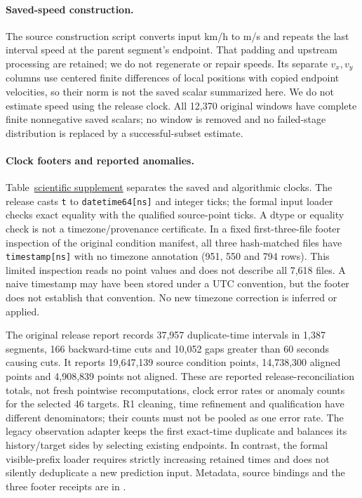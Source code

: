 \paragraph{Saved-speed construction.}
The source construction script converts input km/h to m/s and repeats
the last interval speed at the parent segment's endpoint. That padding and
upstream processing are retained; we do not regenerate or repair speeds.
Its separate \(v_x,v_y\) columns use centered finite differences of local
positions with copied endpoint velocities, so their norm is not the
saved scalar summarized here. We do not estimate speed using the release clock.
All 12,370 original windows have complete finite nonnegative saved
scalars; no window is removed and no failed-stage distribution is replaced
by a successful-subset estimate.

\paragraph{Clock footers and reported anomalies.}
Table~\href{supplement.pdf\#tab:clock-use}{scientific supplement} separates the saved and algorithmic clocks. The
release casts \texttt{t} to \texttt{datetime64[ns]} and integer ticks; the
formal input loader checks exact equality with the qualified source-point
ticks. A dtype or equality check is not a timezone/provenance certificate.
In a fixed first-three-file footer inspection of the original condition
manifest, all three hash-matched files have \texttt{timestamp[ns]} with no
timezone annotation (951, 550 and 794 rows). This limited inspection reads
no point values and does not describe all 7,618 files. A naive timestamp may
have been stored under a UTC convention, but the footer does not establish
that convention. No new timezone correction is inferred or applied.

The original release report records 37,957 duplicate-time intervals in
1,387 segments, 166 backward-time cuts and 10,052 gaps greater than 60
seconds causing cuts. It reports 19,647,139 source condition points,
14,738,300 aligned points and 4,908,839 points not aligned. These are
reported release-reconciliation totals, not fresh pointwise recomputations,
clock error rates or anomaly counts for the selected 46 targets. R1 cleaning,
time refinement and qualification have different denominators; their counts
must not be pooled as one error rate. The legacy observation adapter keeps the
first exact-time duplicate and balances its history/target sides by selecting
existing endpoints. In contrast, the formal visible-prefix loader requires
strictly increasing retained times and does not silently deduplicate a new
prediction input. Metadata, source bindings and the three footer receipts
are in .

